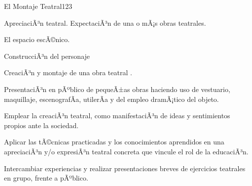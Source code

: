 \begin{syllabus}
\begin{unit}{El  Montaje Teatral}{}{12}{3}
\begin{topics}
	\item ApreciaciÃ³n teatral. ExpectaciÃ³n de una o mÃ¡s obras teatrales.
	\item El espacio escÃ©nico.
	\item ConstrucciÃ³n del personaje
	\item CreaciÃ³n y montaje de una obra teatral .
	\item PresentaciÃ³n en pÃºblico de pequeÃ±as obras haciendo uso de vestuario, maquillaje, escenografÃ­a, utilerÃ­a y del empleo dramÃ¡tico del objeto.
\end{topics}
\begin{unitgoals}
	\item Emplear  la creaciÃ³n teatral, como manifestaciÃ³n de ideas y sentimientos propios ante la sociedad.
	\item Aplicar las tÃ©cnicas practicadas y los conocimientos aprendidos en una apreciaciÃ³n y/o expresiÃ³n teatral concreta que vincule el rol de la educaciÃ³n.
	\item Intercambiar experiencias y realizar presentaciones breves de ejercicios teatrales en grupo, frente a pÃºblico.  
\end{unitgoals}
\end{unit}



\begin{coursebibliography}

\end{coursebibliography}
\end{syllabus}
